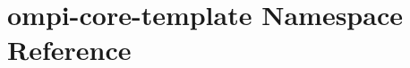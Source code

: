 \hypertarget{namespaceompi-core-template}{\section{ompi-\/core-\/template Namespace Reference}
\label{namespaceompi-core-template}
}
